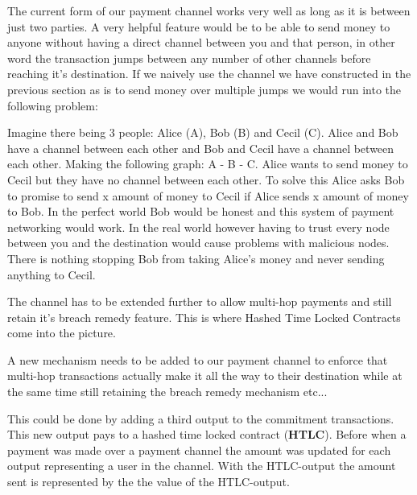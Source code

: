 The current form of our payment channel works very well as long as it is between just two parties. A very helpful feature would be to be able to send money to anyone without having a direct channel between you and that person, in other word the transaction jumps between any number of other channels before reaching it's destination. If we naively use the channel we have constructed in the previous section as is to send money over multiple jumps we would run into the following problem:

Imagine there being 3 people: Alice (A), Bob (B) and Cecil (C). Alice and Bob have a channel between each other and Bob and Cecil have a channel between each other. Making the following graph: A - B - C. Alice wants to send money to Cecil but they have no channel between each other. To solve this Alice asks Bob to promise to send x amount of money to Cecil if Alice sends x amount of money to Bob. In the perfect world Bob would be honest and this system of payment networking would work. In the real world however having to trust every node between you and the destination would cause problems with malicious nodes. There is nothing stopping Bob from taking Alice's money and never sending anything to Cecil. 

The channel has to be extended further to allow multi-hop payments and still retain it's breach remedy feature. This is where Hashed Time Locked Contracts come into the picture. 

A new mechanism needs to be added to our payment channel to enforce that multi-hop transactions actually make it all the way to their destination while at the same time still retaining the breach remedy mechanism etc... 

This could be done by adding a third output to the commitment transactions. This new output pays to a hashed time locked contract (\textbf{HTLC}). Before when a payment was made over a payment channel the amount was updated for each output representing a user in the channel. With the HTLC-output the amount sent is represented by the the value of the HTLC-output. 

